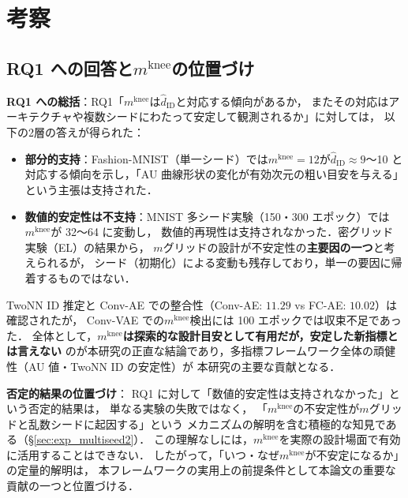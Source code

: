 \documentclass[11pt,a4paper]{jsarticle}
\newcommand{\mknee}{m^{\mathrm{knee}}}
\begin{document}
\section{考察}\label{sec:discussion}

\subsection{RQ1 への回答と$\mknee$の位置づけ}\label{sec:disc_mknee}

\textbf{RQ1 への総括}：RQ1「$\mknee$は$\hat{d}_\mathrm{ID}$と対応する傾向があるか，
またその対応はアーキテクチャや複数シードにわたって安定して観測されるか」に対しては，
以下の2層の答えが得られた：

\begin{itemize}
  \item \textbf{部分的支持}：Fashion-MNIST（単一シード）では$\mknee = 12$が$\hat{d}_\mathrm{ID} \approx 9$〜10
        と対応する傾向を示し，「AU 曲線形状の変化が有効次元の粗い目安を与える」という主張は支持された．
  \item \textbf{数値的安定性は不支持}：MNIST 多シード実験（150・300 エポック）では$\mknee$が 32〜64 に変動し，
        数値的再現性は支持されなかった．密グリッド実験（EL）の結果から，
        $m$グリッドの設計が不安定性の\textbf{主要因の一つ}と考えられるが，
        シード（初期化）による変動も残存しており，単一の要因に帰着するものではない．
\end{itemize}

TwoNN ID 推定と Conv-AE での整合性（Conv-AE: $11.29$ vs FC-AE: $10.02$）は確認されたが，
Conv-VAE での$\mknee$検出には 100 エポックでは収束不足であった．
全体として，\textbf{$\mknee$は探索的な設計目安として有用だが，安定した新指標とは言えない}
のが本研究の正直な結論であり，多指標フレームワーク全体の頑健性（AU 値・TwoNN ID の安定性）が
本研究の主要な貢献となる．

\textbf{否定的結果の位置づけ}：
RQ1 に対して「数値的安定性は支持されなかった」という否定的結果は，
単なる実験の失敗ではなく，
「$\mknee$の不安定性が$m$グリッドと乱数シードに起因する」という
メカニズムの解明を含む積極的な知見である（§\ref{sec:exp_multiseed2}）．
この理解なしには，$\mknee$を実際の設計場面で有効に活用することはできない．
したがって，「いつ・なぜ$\mknee$が不安定になるか」の定量的解明は，
本フレームワークの実用上の前提条件として本論文の重要な貢献の一つと位置づける．
\end{document}
